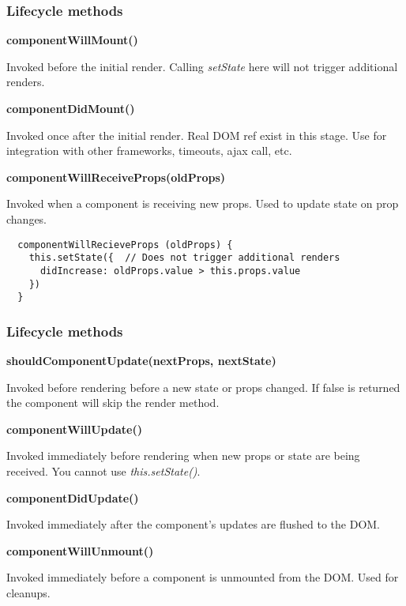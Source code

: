 \begin{frame}[fragile]

  \frametitle{Lifecycle methods}
  \textbf{componentWillMount()}

  \small Invoked before the initial render. Calling \textit{setState} here will not trigger additional renders.

  \textbf{componentDidMount()}

  \small Invoked once after the initial render. Real DOM ref exist in this stage.  Use for integration with other frameworks, timeouts, ajax call, etc.

  \textbf{componentWillReceiveProps(oldProps)}

  \small Invoked when a component is receiving new props. Used to update state on prop changes.
  \begin{verbatim}
  componentWillRecieveProps (oldProps) {
    this.setState({  // Does not trigger additional renders
      didIncrease: oldProps.value > this.props.value
    })
  }
  \end{verbatim}

\end{frame}

\begin{frame}[fragile]

  \frametitle{Lifecycle methods}
  \textbf{shouldComponentUpdate(nextProps, nextState)}

  \small Invoked before rendering before a new state or props changed. If false is returned the component will skip the render method.

  \textbf{componentWillUpdate()}

  \small Invoked immediately before rendering when new props or state are being received. You cannot use \textit{this.setState()}.

  \textbf{componentDidUpdate()}

  \small Invoked immediately after the component's updates are flushed to the DOM.

  \textbf{componentWillUnmount()}

  \small Invoked immediately before a component is unmounted from the DOM. Used for cleanups.

\end{frame}

